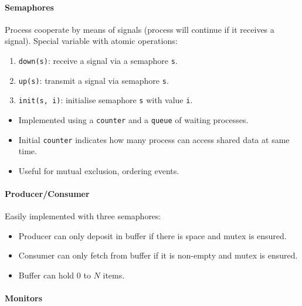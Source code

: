 \documentclass[twocolumn,english]{article}
\begin{document}
\paragraph{Semaphores}

Process cooperate by means of signals (process will continue if it
receives a signal). Special variable with atomic operations:
\begin{enumerate}
\item \texttt{down(s)}: receive a signal via a semaphore \texttt{s}.
\item \texttt{up(s)}: transmit a signal via semaphore \texttt{s}.
\item \texttt{init(s, i)}: initialise semaphore \texttt{s} with value \texttt{i}.
\end{enumerate}
\begin{itemize}
\item Implemented using a \texttt{counter} and a \texttt{queue} of waiting
processes.
\item Initial \texttt{counter} indicates how many process can access shared
data at same time.
\item Useful for mutual exclusion, ordering events.
\end{itemize}

\paragraph{Producer/Consumer}

Easily implemented with three semaphores:
\begin{itemize}
\item Producer can only deposit in buffer if there is space and mutex is
ensured.
\item Consumer can only fetch from buffer if it is non-empty and mutex is
ensured.
\item Buffer can hold $0$ to $N$ items.
\end{itemize}

\paragraph{Monitors}
\end{document}
